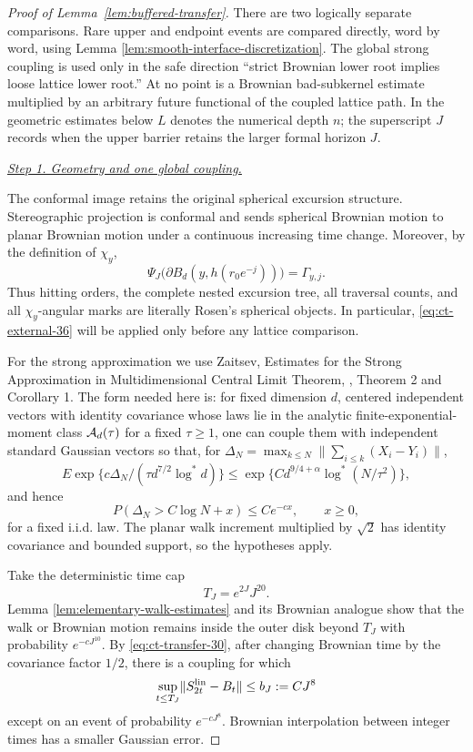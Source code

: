 \begin{proof}[Proof of Lemma~\ref{lem:buffered-transfer}]
There are two logically separate comparisons.  Rare upper and endpoint
events are compared directly, word by word, using Lemma
\ref{lem:smooth-interface-discretization}.  The global strong coupling is used
only in the safe direction ``strict Brownian lower root implies loose
lattice lower root.''  At no point is a Brownian bad-subkernel estimate
multiplied by an arbitrary future functional of the coupled lattice path.
In the geometric estimates below $L$ denotes the numerical depth $n$;
the superscript $J$ records when the upper barrier retains the larger
formal horizon $J$.

\smallskip\noindent
\underline{\textit{Step 1. Geometry and one global coupling.}}

The conformal image retains the original spherical excursion structure.  Stereographic
projection is conformal and sends spherical Brownian motion to planar
Brownian motion under a continuous increasing time change.  Moreover,
by the definition of $\chi_y$,
\[
\Psi_J\bigl(\partial B_d(y,h(r_0e^{-j}))\bigr)
       =\Gamma_{y,j}.
\]
Thus hitting orders, the complete nested excursion tree, all traversal
counts, and all $\chi_y$-angular marks are literally Rosen's spherical
objects.  In particular, \eqref{eq:ct-external-36} will be applied only before any lattice
comparison.

For the strong approximation we use Zaitsev, Estimates for the Strong
Approximation in Multidimensional Central Limit Theorem,
\cite{Zaitsev2003},
Theorem 2 and Corollary 1.  The form needed here is: for fixed
dimension $d$, centered independent vectors with identity covariance
whose laws lie in the analytic finite-exponential-moment class
${\cal A}_d(\tau)$ for a fixed $\tau\ge1$, one can couple them with independent standard
Gaussian vectors so that, for
$\Delta_N=\max_{k\le N}\lVert\sum_{i\le k}(X_i-Y_i)\rVert$,
\[
E\exp\{c\Delta_N/(\tau d^{7/2}\log^*d)\}
 \le \exp\{C d^{9/4+\alpha}\log^*(N/\tau^2)\},
\]
and hence
\begin{equation}
P(\Delta_N>C\log N+x)\le C e^{-cx},\qquad x\ge0,\label{eq:ct-transfer-30}
\end{equation}
for a fixed i.i.d. law.  The planar walk increment multiplied by $\sqrt2$
has identity covariance and bounded support, so the hypotheses apply.

Take the deterministic time cap
\[
T_J=e^{2J}J^{20}.
\]
Lemma \ref{lem:elementary-walk-estimates} and its Brownian analogue show that
the walk or Brownian motion remains inside the outer disk beyond $T_J$
with probability $e^{-cJ^{10}}$.  By \eqref{eq:ct-transfer-30}, after changing Brownian time
by the covariance factor $1/2$, there is a coupling for which
\begin{equation}
\sup_{t\le T_J}\lVert S^{\rm lin}_{2t}-B_t\rVert
       \le b_J:=CJ^8\label{eq:ct-transfer-31}
\end{equation}
except on an event of probability $e^{-cJ^8}$.  Brownian interpolation
between integer times has a smaller Gaussian error.


\end{proof}
